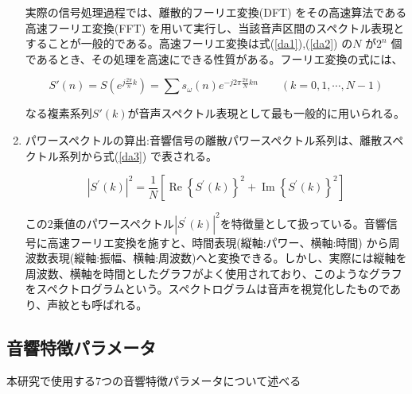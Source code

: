 \begin{enumerate}
実際の信号処理過程では、離散的フーリエ変換(DFT) をその高速算法である高速フーリエ変換(FFT) を用いて実行し、当該音声区間のスペクトル表現とすることが一般的である。高速フーリエ変換は式(\ref{da1}),(\ref{da2}) の$N$ が$2^n$ 個であるとき、その処理を高速にできる性質がある。フーリエ変換の式には、

\begin{equation}
S\prime(n)=S(e^{j\frac{2\pi}{n}k})=\sum s_\omega(n)e^{-j2\pi \frac{2\pi}{N}kn} \qquad (k=0,1,\cdots,N-1)
\end{equation}

なる複素系列$S\prime(k)$が音声スペクトル表現として最も一般的に用いられる。

\item パワースペクトルの算出:音響信号の離散パワースペクトル系列は、離散スペクトル系列から式(\ref{da3}) で表される。

\begin{equation}
\label{da3}
|S^\prime(k)|^2=\frac{1}{N}[\operatorname{Re}\left\{S^\prime(k)\right\}^2+\operatorname{Im}\left\{S^\prime(k)\right\}^2]
\end{equation}

この2乗値のパワースペクトル$|S^\prime(k)|^2$を特徴量として扱っている。音響信号に高速フーリエ変換を施すと、時間表現(縦軸:パワー、横軸:時間) から周波数表現(縦軸:振幅、横軸:周波数)へと変換できる。しかし、実際には縦軸を周波数、横軸を時間としたグラフがよく使用されており、このようなグラフをスペクトログラムという。スペクトログラムは音声を視覚化したものであり、声紋とも呼ばれる。

\end{enumerate}\par

\subsection{音響特徴パラメータ}
本研究で使用する7つの音響特徴パラメータについて述べる\cite{shimae_10}

